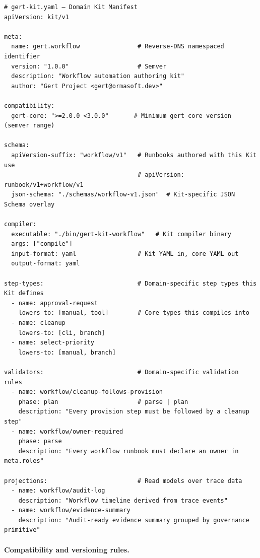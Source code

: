 \begin{verbatim}
# gert-kit.yaml — Domain Kit Manifest
apiVersion: kit/v1

meta:
  name: gert.workflow                # Reverse-DNS namespaced identifier
  version: "1.0.0"                   # Semver
  description: "Workflow automation authoring kit"
  author: "Gert Project <gert@ormasoft.dev>"

compatibility:
  gert-core: ">=2.0.0 <3.0.0"       # Minimum gert core version (semver range)

schema:
  apiVersion-suffix: "workflow/v1"   # Runbooks authored with this Kit use
                                     # apiVersion: runbook/v1+workflow/v1
  json-schema: "./schemas/workflow-v1.json"  # Kit-specific JSON Schema overlay

compiler:
  executable: "./bin/gert-kit-workflow"   # Kit compiler binary
  args: ["compile"]
  input-format: yaml                 # Kit YAML in, core YAML out
  output-format: yaml

step-types:                          # Domain-specific step types this Kit defines
  - name: approval-request
    lowers-to: [manual, tool]        # Core types this compiles into
  - name: cleanup
    lowers-to: [cli, branch]
  - name: select-priority
    lowers-to: [manual, branch]

validators:                          # Domain-specific validation rules
  - name: workflow/cleanup-follows-provision
    phase: plan                      # parse | plan
    description: "Every provision step must be followed by a cleanup step"
  - name: workflow/owner-required
    phase: parse
    description: "Every workflow runbook must declare an owner in meta.roles"

projections:                         # Read models over trace data
  - name: workflow/audit-log
    description: "Workflow timeline derived from trace events"
  - name: workflow/evidence-summary
    description: "Audit-ready evidence summary grouped by governance primitive"
\end{verbatim}

\paragraph{Compatibility and versioning rules.}

